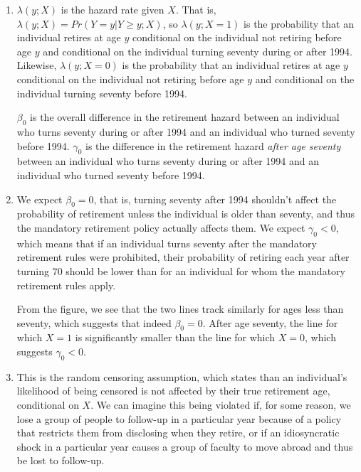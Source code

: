 \documentclass{article}
\begin{document}
\begin{enumerate}
	\begin{enumerate}

		\item 

		$\lambda(y;X)$ is the hazard rate given $X$. That is, $\lambda(y;X) = Pr(Y=y| Y \geq y; X)$, so  $\lambda(y;X=1)$ is the probability that an individual retires at age $y$ conditional on the individual not retiring before age $y$ and conditional on the individual turning seventy during or after 1994. Likewise, $\lambda(y;X=0)$ is the probability that an individual retires at age $y$ conditional on the individual not retiring before age $y$ and conditional on the individual turning seventy before 1994.

		$\beta_0$ is the overall difference in the retirement hazard between an individual who turns seventy during or after 1994 and an individual who turned seventy before 1994. $\gamma_0$ is the difference in the retirement hazard \textit{after age seventy} between an individual who turns seventy during or after 1994 and an individual who turned seventy before 1994. 

		\item

		We expect $\beta_0 = 0$, that is, turning seventy after 1994 shouldn't affect the probability of retirement unless the individual is older than seventy, and thus the mandatory retirement policy actually affects them. We expect $\gamma_0 < 0$, which means that if an individual turns seventy after the mandatory retirement rules were prohibited, their probability of retiring each year after turning 70 should be lower than for an individual for whom the mandatory retirement rules apply.

		From the figure, we see that the two lines track similarly for ages less than seventy, which suggests that indeed $\beta_0 = 0$. After age seventy, the line for which $X = 1$ is significantly smaller than the line for which $X = 0$, which suggests $\gamma_0 < 0$.

		\item

		This is the random censoring assumption, which states than an individual's likelihood of being censored is not affected by their true retirement age, conditional on $X$. We can imagine this being violated if, for some reason, we lose a group of people to follow-up in a particular year because of a policy that restricts them from disclosing when they retire, or if an idiosyncratic shock in a particular year causes a group of faculty to move abroad and thus be lost to follow-up.


\end{enumerate}
\end{enumerate}
\end{document}
